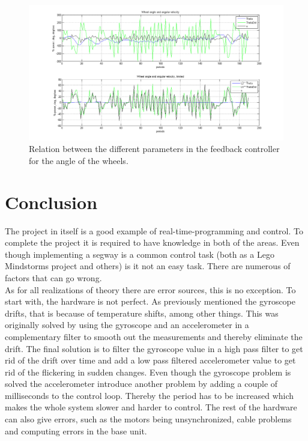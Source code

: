 \documentclass[a4paper]{article}
\begin{document}
\begin{figure}[H]
  \centering
\includegraphics[scale=0.45]{pic/feedbackPlot2.png}
\caption{Relation between the different parameters in the feedback controller for the angle of the wheels.}
\end{figure}

\section{Conclusion}
The project in itself is a good example of real-time-programming and control. To complete the project it is required to have knowledge in both of the areas. Even though implementing a segway is a common control task (both as a Lego Mindstorms project and others) is it not an easy task. There are numerous of factors that can go wrong.\\

As for all realizations of theory there are error sources, this is no exception. To start with, the hardware is not perfect. As previously mentioned the gyroscope drifts, that is because of temperature shifts, among other things. This was originally solved by using the gyroscope and an accelerometer in a complementary filter to smooth out the measurements and thereby eliminate the drift. The final solution is to filter the gyroscope value in a high pass filter to get rid of the drift over time and add a low pass filtered accelerometer value to get rid of the flickering in sudden changes. Even though the gyroscope problem is solved the accelerometer introduce another problem by adding a couple of milliseconds to the control loop. Thereby the period has to be increased which makes the whole system slower and harder to control. The rest of the hardware can also give errors, such as the motors being unsynchronized, cable problems and computing errors in the base unit\cite{filter}.\\
\end{document}
